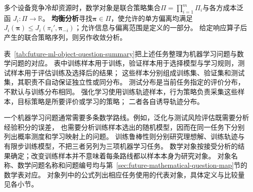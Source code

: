 多个设备竞争冷却资源时，数学对象是联合策略集合$\Pi=\prod_{i=1}^m\Pi_i$与各方成本泛函
$J_i:\Pi\to\mathbb R$。
\textbf{均衡分析}寻找$\bm\pi\in\Pi$，使允许的单方偏离均满足
$J_i(\bm\pi)\leq J_i(\pi_i',\bm\pi_{-i})$；允许信息与偏离范围是定义的一部分。
给定响应算子后产生的联合策略序列，则另作收敛分析。

表~\ref{tab:future-ml-object-question-summary}把上述任务整理为机器学习问题与数学问题的对应。
表中训练样本用于训练，验证样本用于选择模型与学习规则，测试样本用于评估训练及选择后的结果；
这些样本分别组成训练集、验证集和测试集，其职责不自动保证独立性或同分布。
测试分布是当前任务指定的评价分布，不默认与训练分布相同。
强化学习使用训练轨迹样本，行为策略负责采集这些样本，目标策略是所要评价或学习的策略；
二者各自诱导轨迹分布。

一个机器学习问题通常需要多条数学路线。例如，泛化与测试风险评估既需要分析经验积分的误差，
也需要分析训练样本选出的随机模型，因而在同一任务下分别列出概率测度和学习映射上的问题。
训练鲁棒性则分别研究理想解、训练轨迹与有限步训练模型，不把三者另列为三项机器学习任务。
数学对象按接受分析的结果确定；改变训练样本并不意味着每条路线都以样本本身为研究对象。
对象名称、数学问题名称和问题编号均与第~\ref{sec:future-mathematical-question-map}节的数学表对应。
对象列中的公式列出相应任务使用的代表对象，具体定义与比较量见各小节。

